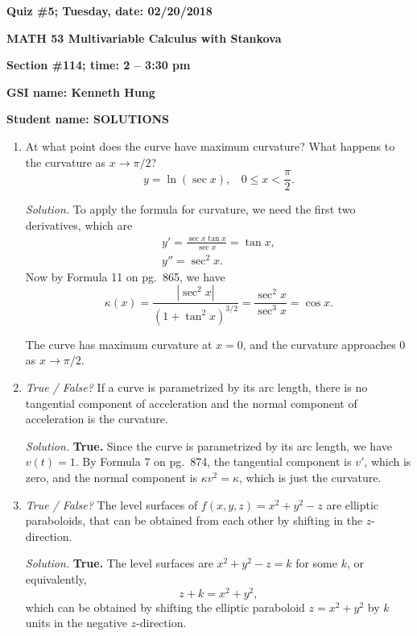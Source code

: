 \documentclass{article}
\begin{document}
{\bf Quiz \#5; Tuesday, date: 02/20/2018}

{\bf MATH 53 Multivariable Calculus with Stankova}

{\bf Section \#114; time: 2 -- 3:30 pm}

{\bf GSI name: Kenneth Hung}

{\bf Student name: SOLUTIONS}

\vspace*{0.25in}

\begin{enumerate}
\item At what point does the curve have maximum curvature? What happens to the curvature as $x \to \pi / 2$?
\[
y = \ln (\sec x), ~~~~ 0 \le x < \frac{\pi}{2}.
\]

{\em Solution.} To apply the formula for curvature, we need the first two derivatives, which are
\begin{align*}
y' = \frac{\sec x \tan x}{\sec x} = \tan x, \\
y'' = \sec^2 x.
\end{align*}
Now by Formula 11 on pg.\ 865, we have
\[
\kappa(x) = \frac{|\sec^2 x|}{\left(1 + \tan^2 x\right)^{3/2}} = \frac{\sec^2 x}{\sec^3 x} = \cos x.
\]

The curve has maximum curvature at $x = 0$, and the curvature approaches $0$ as $x \to \pi / 2$.

\item {\em True / False?} If a curve is parametrized by its arc length, there is no tangential component of acceleration and the normal component of acceleration is the curvature.

{\em Solution.} {\bf True.} Since the curve is parametrized by its arc length, we have $v(t) = 1$. By Formula 7 on pg.\ 874, the tangential component is $v'$, which is zero, and the normal component is $\kappa v^2 = \kappa$, which is just the curvature.

\item {\em True / False?} The level surfaces of $f(x, y, z) = x^2 + y^2 - z$ are elliptic paraboloids, that can be obtained from each other by shifting in the $z$-direction.

{\em Solution.} {\bf True.} The level surfaces are $x^2 + y^2 - z = k$ for some $k$, or equivalently,
\[
z + k = x^2 + y^2,
\]
which can be obtained by shifting the elliptic paraboloid $z = x^2 + y^2$ by $k$ units in the negative $z$-direction.
\end{enumerate}
\end{document}
